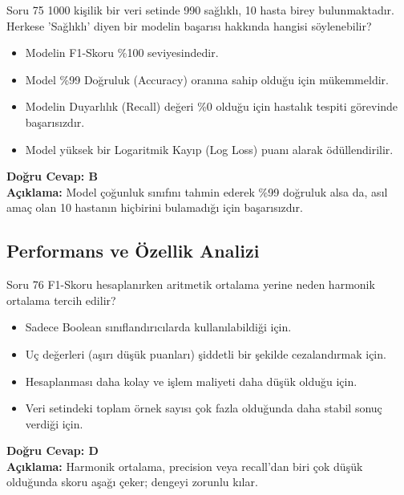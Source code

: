 \documentclass[12pt,a4paper]{article}
\begin{document}
\begin{testcard}{Soru 75}
    1000 kişilik bir veri setinde 990 sağlıklı, 10 hasta birey bulunmaktadır. Herkese 'Sağlıklı' diyen bir modelin başarısı hakkında hangisi söylenebilir?
    \begin{itemize}
        \item[A)] Modelin F1-Skoru \%100 seviyesindedir.
        \item[B)] Model \%99 Doğruluk (Accuracy) oranına sahip olduğu için mükemmeldir.
        \item[C)] Modelin Duyarlılık (Recall) değeri \%0 olduğu için hastalık tespiti görevinde başarısızdır.
        \item[D)] Model yüksek bir Logaritmik Kayıp (Log Loss) puanı alarak ödüllendirilir.
    \end{itemize}
    \tcblower
    \textbf{Doğru Cevap: B} \\
    \textbf{Açıklama:} Model çoğunluk sınıfını tahmin ederek \%99 doğruluk alsa da, asıl amaç olan 10 hastanın hiçbirini bulamadığı için başarısızdır.
\end{testcard}


\newpage
\subsection{Performans ve Özellik Analizi}

\begin{testcard}{Soru 76}
    F1-Skoru hesaplanırken aritmetik ortalama yerine neden harmonik ortalama tercih edilir?
    \begin{itemize}
        \item[A)] Sadece Boolean sınıflandırıcılarda kullanılabildiği için.
        \item[B)] Uç değerleri (aşırı düşük puanları) şiddetli bir şekilde cezalandırmak için.
        \item[C)] Hesaplanması daha kolay ve işlem maliyeti daha düşük olduğu için.
        \item[D)] Veri setindeki toplam örnek sayısı çok fazla olduğunda daha stabil sonuç verdiği için.
    \end{itemize}
    \tcblower
    \textbf{Doğru Cevap: D} \\
    \textbf{Açıklama:} Harmonik ortalama, precision veya recall'dan biri çok düşük olduğunda skoru aşağı çeker; dengeyi zorunlu kılar.
\end{testcard}
\end{document}
